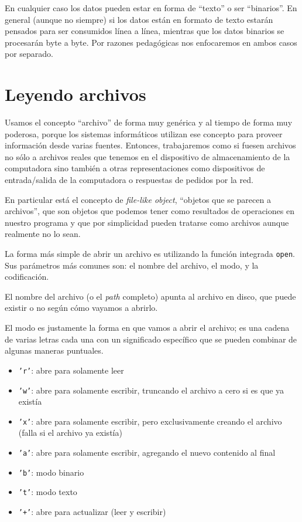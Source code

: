 En cualquier caso los datos pueden estar en forma de ``texto'' o ser ``binarios''. En general (aunque no siempre) si los datos están en formato de texto estarán pensados para ser consumidos línea a línea, mientras que los datos binarios se procesarán byte a byte. Por razones pedagógicas nos enfocaremos en ambos casos por separado.


\section{Leyendo archivos}\label{sec:archivos}

Usamos el concepto ``archivo'' de forma muy genérica y al tiempo de forma muy poderosa, porque los sistemas informáticos utilizan ese concepto para proveer información desde varias fuentes. Entonces, trabajaremos como si fuesen archivos no sólo a archivos reales que tenemos en el dispositivo de almacenamiento de la computadora sino también a otras representaciones como dispositivos de entrada/salida de la computadora o respuestas de pedidos por la red.

En particular está el concepto de \textit{file-like object}, ``objetos que se parecen a archivos'', que son objetos que podemos tener como resultados de operaciones en nuestro programa y que por simplicidad pueden tratarse como archivos aunque realmente no lo sean.

La forma más simple de abrir un archivo es utilizando la función integrada \texttt{open}. Sus parámetros más comunes son: el nombre del archivo, el modo, y la codificación. 

El nombre del archivo (o el \textit{path} completo) apunta al archivo en disco, que puede existir o no según cómo vayamos a abrirlo. 

El modo es justamente la forma en que vamos a abrir el archivo; es una cadena de varias letras cada una con un significado específico que se pueden combinar de algunas maneras puntuales.

\begin{itemize}
    \item \texttt{'r'}: abre para solamente leer
    \item \texttt{'w'}: abre para solamente escribir, truncando el archivo a cero si es que ya existía
    \item \texttt{'x'}: abre para solamente escribir, pero exclusivamente creando el archivo (falla si el archivo ya existía)
    \item \texttt{'a'}: abre para solamente escribir, agregando el nuevo contenido al final
    \item \texttt{'b'}: modo binario
    \item \texttt{'t'}: modo texto
    \item \texttt{'+'}: abre para actualizar (leer y escribir)
\end{itemize}

